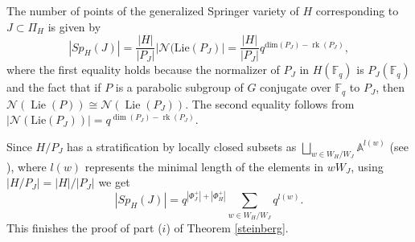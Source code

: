 \documentclass{amsart}
\theoremstyle{plain}
\theoremstyle{definition}
\theoremstyle{remark}
\DeclareMathOperator{\rk}{rk}
\DeclareMathOperator{\lie}{Lie}
\begin{document}
The number of points of the generalized Springer variety of $H$ corresponding to $J\subset\Pi_H$ is given by
\begin{equation}\label{intermediate}
|Sp_{H}(J)|=\frac{|H|}{|P_{J}|}|\mathcal{N}(\text{Lie}(P_J)|=\frac{|H|}{|P_{J}|}q^{\text{dim}(P_{J})-\rk(P_{J})},
\end{equation}
where the first equality holds because the normalizer of $P_J$ in $H(\mathbb{F}_{q})$ is $P_{J}(\mathbb{F}_{q})$ and the fact that if $P$ is a parabolic subgroup of $G$ conjugate over $\mathbb{F}_{q}$ to $P_{J}$, then $\mathcal{N}(\lie(P))\cong\mathcal{N}(\lie(P_{J}))$. The second equality follows from $|\mathcal{N}(\text{Lie}(P_J))|=q^{\dim(P_{J})-\rk(P_{J})}$.

Since $H/P_{J}$ has a stratification by locally closed subsets as $\bigsqcup_{{w\in W_{H}/W_J}}\mathbb{A}^{l(w)}$ (see \cite[Proposition 3.16]{BT}), where $l(w)$ represents the minimal length of the elements in $wW_J$, using $|H/P_{J}|=|H|/|P_{J}|$ we get
\[
|Sp_{H}(J)|=q^{|\Phi_{J}^{+}|+|\Phi_{H}^{+}|}\sum_{w\in W_{H}/W_J}q^{l(w)}.
\]
This finishes the proof of part ($i$) of Theorem \ref{steinberg}.
\end{document}
